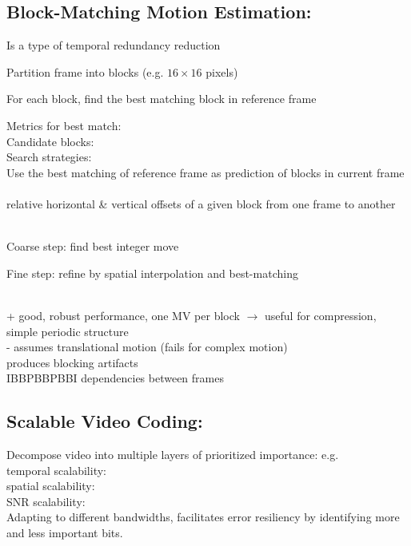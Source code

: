 \subsection*{Block-Matching Motion Estimation:}
Is a type of temporal redundancy reduction\\
\begin{compactenum}
    \item Partition frame into blocks (e.g. $16 \times 16$ pixels)
    \item For each block, find the best matching block in reference frame
\end{compactenum}
Metrics for best match: \\
Candidate blocks: \\
Search strategies: \\
Use the best matching of reference frame as prediction of blocks in current frame\\
\\
 relative horizontal \& vertical offsets of a given block from one frame to another\\
\\
\begin{compactenum}
    \item Coarse step: find best integer move
    \item Fine step: refine by spatial interpolation and best-matching
\end{compactenum}
\\
+ good, robust performance, one MV per block $\rightarrow$ useful for compression, simple periodic structure \\
- assumes translational motion (fails for complex motion)\\
 produces blocking artifacts\\
 IBBPBBPBBI dependencies between frames
\subsection*{Scalable Video Coding:}
Decompose video into multiple layers of prioritized importance: e.g. \\
temporal scalability: \\
spatial scalability: \\
SNR scalability: \\
 Adapting to different bandwidths, facilitates error resiliency by identifying more and less important bits.